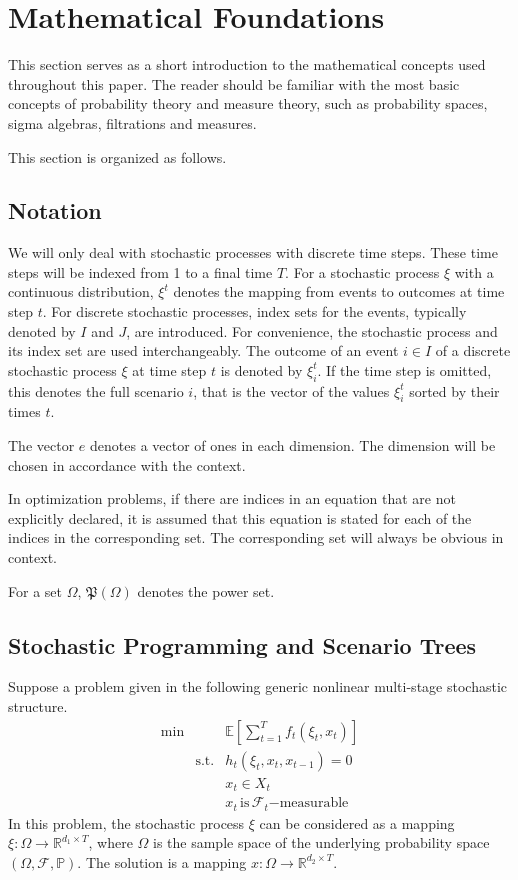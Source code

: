 \section{Mathematical Foundations}
\label{sec:math-foundations}
This section serves as a short introduction to the mathematical concepts used throughout this paper. The reader should be familiar with the most basic concepts of probability theory and measure theory, such as probability spaces, sigma algebras, filtrations and measures.

This section is organized as follows. 
\subsection{Notation}
We will only deal with stochastic processes with discrete time steps.
These time steps will be indexed from 1 to a final time $T$.
For a stochastic process $\xi$ with a continuous distribution, $\xi^t$ denotes the mapping from events to outcomes at time step $t$.
For discrete stochastic processes, index sets for the events, typically denoted by $I$ and $J$, are introduced.
For convenience, the stochastic process and its index set are used interchangeably.
The outcome of an event $i\in I$ of a discrete stochastic process $\xi$ at time step $t$ is denoted by $\xi_i^t$.
If the time step is omitted, this denotes the full scenario $i$, that is the vector of the values $\xi_i^t$ sorted by their times $t$.

The vector $e$ denotes a vector of ones in each dimension.
The dimension will be chosen in accordance with the context. 

In optimization problems, if there are indices in an equation that are not explicitly declared, it is assumed that this equation is stated for each of the indices in the corresponding set.
The corresponding set will always be obvious in context.

For a set $\Omega$, $\mathfrak{P}(\Omega)$ denotes the power set.
\subsection{Stochastic Programming and Scenario Trees}
Suppose a problem given in the following generic nonlinear multi-stage stochastic structure. 
\begin{eqnarray}
  \label{eq:genericSP}
  \min &&\mathbb{E}\left[\sum_{t=1}^Tf_t(\xi_t, x_t)\right]\\
  &\mathrm{s.t.}& h_t(\xi_t, x_t, x_{t-1}) = 0\\
  &&x_t \in X_t\\
  &&x_t \, \mathrm{is}\,\mathcal{F}_t \mathrm{-measurable} \label{eqn:measurability-constraint}
\end{eqnarray}
In this problem, the stochastic process $\xi$ can be considered as a mapping $\xi:\Omega\rightarrow \mathbb{R}^{d_1\times T}$, where $\Omega$ is the sample space of the underlying probability space $(\Omega, \mathcal{F}, \mathbb{P})$.
The solution is a mapping $x:\Omega\rightarrow \mathbb{R}^{d_2\times T}$.

